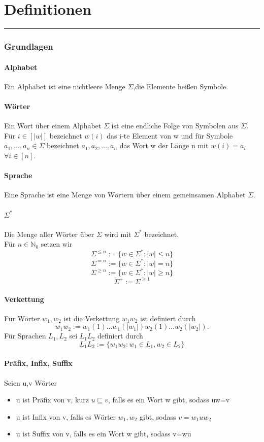 \documentclass[DIV=15]{scrartcl}
\begin{document}
\part{Definitionen}
\rule{467.1pt}{0.4pt}
\section{Grundlagen}
    \subsection{Alphabet}
        Ein Alphabet ist eine nichtleere Menge \(\Sigma\),die Elemente heißen Symbole.
    \subsection{Wörter}
        Ein Wort über einem Alphabet \(\Sigma\) ist eine endliche Folge von Symbolen aus \(\Sigma\).\\
        Für \(i\in[|w|]\) bezeichnet \(w(i)\) das i-te Element von w und für Symbole \(a_1,\dots,a_n\in \Sigma\)
        bezeichnet \(a_1,a_2,\dots,a_n\) das Wort w der Länge n mit \(w(i)=a_i\) \(\forall i\in [n]\).
    \subsection{Sprache}
        Eine Sprache ist eine Menge von Wörtern über einem gemeinsamen Alphabet \(\Sigma\).
    \subsection{\(\Sigma^*\)}
        Die Menge aller Wörter über \(\Sigma\) wird mit \(\Sigma^*\) bezeichnet.\\
        Für \(n\in\mathbb{N}_0\) setzen wir
        \[\Sigma^{\leq n}:=\{w\in\Sigma^*:|w|\leq n\}\]
        \[\Sigma^{=n}:=\{w\in\Sigma^*:|w|=n\}\]
        \[\Sigma^{\geq n}:=\{w\in\Sigma^*:|w|\geq n\}\]
        \[\Sigma^{+}:=\Sigma^{\geq 1}\]
    \subsection{Verkettung}
        Für Wörter \(w_1,w_2\) ist die Verkettung \(w_1w_2\) ist definiert durch 
        \[w_1w_2:=w_1(1)\dots w_1(|w_1|)w_2(1)\dots w_2(|w_2|).\]
        Für Sprachen \(L_1,L_2\) sei \(L_1L_2\) definiert durch 
        \[L_1L_2:=\{w_1w_2:w_1\in L_1, w_2\in L_2\}\]
    \subsection{Präfix, Infix, Suffix}
        Seien u,v Wörter 
        \begin{itemize}
            \item u ist Präfix von v, kurz \(u\sqsubseteq v\), falls es ein Wort w gibt, sodass uw=v 
            \item u ist Infix von v, falls es Wörter \(w_1,w_2\) gibt, sodass \(v=w_1uw_2\)
            \item u ist Suffix von v, falls es ein Wort w gibt, sodass v=wu
        \end{itemize}
\end{document}
